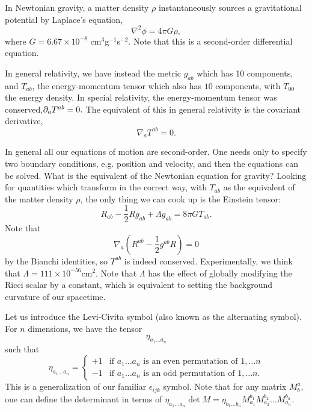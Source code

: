 In Newtonian gravity, a matter density $\rho$ instantaneously sources a gravitational potential by Laplace's equation,
$$\nabla^2 \phi=4\pi G\rho,$$
where $G=6.67\times 10^{-8}$ cm$^3$g$^{-1}$s$^{-2}$. Note that this is a second-order differential equation.

In general relativity, we have instead the metric $g_{ab}$ which has 10 components, and $T_{ab}$, the energy-momentum tensor which also has $10$ components, with $T_{00}$ the energy density. In special relativity, the energy-momentum tensor was conserved,$\partial_a T^{ab}=0.$ The equivalent of this in general relativity is the covariant derivative,
$$\nabla_a T^{ab}=0.$$

In general all our equations of motion are second-order. One needs only to specify two boundary conditions, e.g. position and velocity, and then the equations can be solved. What is the equivalent of the Newtonian equation for gravity? Looking for quantities which transform in the correct way, with $T_{ab}$ as the equivalent of the matter density $\rho$, the only thing we can cook up is the Einstein tensor:
$$R_{ab}-\frac{1}{2}R g_{ab}+\Lambda g_{ab}=8\pi G T_{ab}.$$
Note that
$$\nabla_a(R^{ab}-\frac{1}{2} g^{ab}R)=0$$
by the Bianchi identities, so $T^{ab}$ is indeed conserved.%
Experimentally, we think that $\Lambda=111\times 10^{-56}$cm$^2$. Note that $\Lambda$ has the effect of globally modifying the Ricci scalar by a constant, which is equivalent to setting the background curvature of our spacetime.

\begin{defn}
Let us introduce the Levi-Civita symbol (also known as the alternating symbol). For $n$ dimensions, we have the tensor
$$\eta_{a_1\ldots a_n}$$ such that
$$\eta_{a_1\ldots a_n}=\begin{cases}
+1 &\text{if }a_1\ldots a_n\text{ is an even permutation of }1,\ldots n\\
-1 &\text{if }a_1\ldots a_n\text{ is an odd permutation of }1,\ldots n.
\end{cases}$$
This is a generalization of our familiar $\epsilon_{ijk}$ symbol. Note that for any matrix $M^a_b,$ one can define the determinant in terms of
$\eta_{a_1\ldots a_n}\det M = \eta_{b_1\ldots b_n}M^{b_1}_{a_1} M^{b_2}_{a_2}\ldots M^{b_n}_{a_n}.$
\end{defn}

